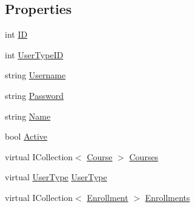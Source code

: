 \subsection*{Properties}
\begin{DoxyCompactItemize}
\item 
int \hyperlink{class_uni_enrollment___m_v_c_1_1_models_1_1_user_adee6f0ebfaebca34888fb5378a437bfa}{ID}
\item 
int \hyperlink{class_uni_enrollment___m_v_c_1_1_models_1_1_user_a4f4c507ff2264229f9e1a0d319134a33}{User\+Type\+ID}
\item 
string \hyperlink{class_uni_enrollment___m_v_c_1_1_models_1_1_user_a9c852662d106e22d53bb00bfc8945423}{Username}
\item 
string \hyperlink{class_uni_enrollment___m_v_c_1_1_models_1_1_user_a9f4573eb934d5201cfbb5eb769b057bf}{Password}
\item 
string \hyperlink{class_uni_enrollment___m_v_c_1_1_models_1_1_user_ac34d9112ca308c7ca425c344c5d05a79}{Name}
\item 
bool \hyperlink{class_uni_enrollment___m_v_c_1_1_models_1_1_user_aad8a758f81d61dbace19dc3cd010a470}{Active}
\item 
virtual I\+Collection$<$ \hyperlink{class_uni_enrollment___m_v_c_1_1_models_1_1_course}{Course} $>$ \hyperlink{class_uni_enrollment___m_v_c_1_1_models_1_1_user_a62d03b5f502392b690ba4a97e319b032}{Courses}
\item 
virtual \hyperlink{class_uni_enrollment___m_v_c_1_1_models_1_1_user_type}{User\+Type} \hyperlink{class_uni_enrollment___m_v_c_1_1_models_1_1_user_ab82d44a89b2d1a28799473bb38e080d0}{User\+Type}
\item 
virtual I\+Collection$<$ \hyperlink{class_uni_enrollment___m_v_c_1_1_models_1_1_enrollment}{Enrollment} $>$ \hyperlink{class_uni_enrollment___m_v_c_1_1_models_1_1_user_a5ebaaaefeb0b09ea8a85dd1a77178891}{Enrollments}
\end{DoxyCompactItemize}


